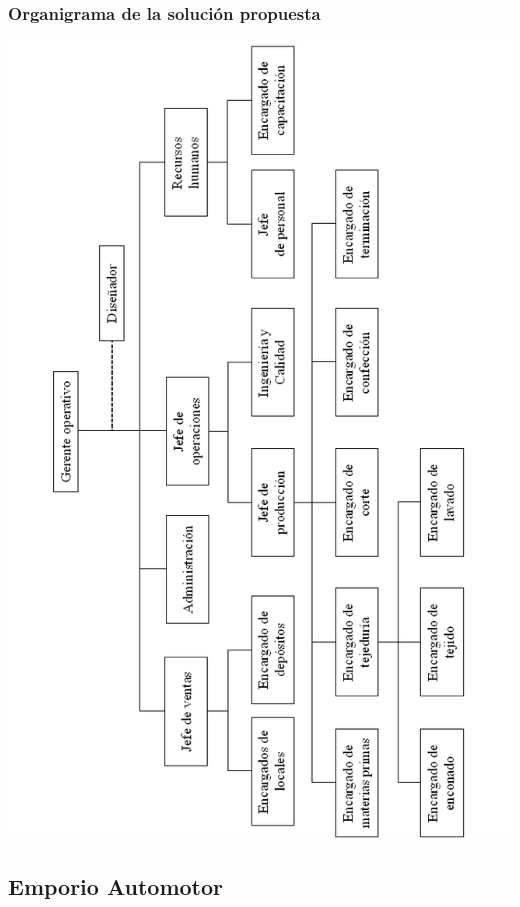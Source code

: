 \documentclass[a4paper,10pt,titlepage]{article}
\begin{document}
\subsubsection{Organigrama de la soluci\'on propuesta}
	\begin{center}
	\includegraphics[width=415pt]{./DollyOrnigramaSolucion.png}
	\end{center}


\newpage
\subsection{Emporio Automotor}
\end{document}

